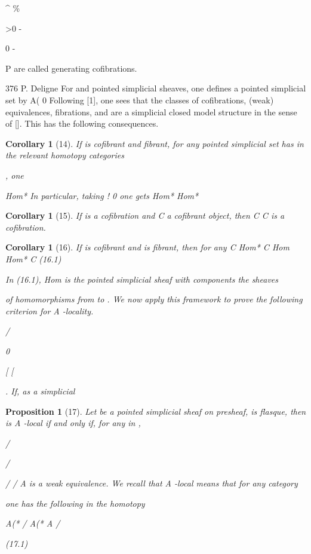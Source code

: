 \documentclass[11pt,a4paper]{article}
\theoremstyle{plain}
\newtheorem{proposition}[theorem]{Proposition}
\newtheorem{corollary}[theorem]{Corollary}
\theoremstyle{definition}
\begin{document}
\textasciicircum{} \%

>0  - 

0  - 

P are called generating cofibrations.

376
P. Deligne
For  and  pointed simplicial sheaves, one defines a pointed simplicial set
   by
   A( 0   
Following [1], one sees that the classes of cofibrations, (weak) equivalences, fibrations, and are a simplicial closed model structure in the sense of []. This has the
following consequences.





\begin{corollary}[14]
If is cofibrant and fibrant, for any pointed simplicial set
has in the relevant homotopy categories

, one

    Hom*    
In particular, taking ! 0  one gets
Hom*       
Hom*

\end{corollary}

\begin{corollary}[15]
If 
 is a cofibration and C a cofibrant object, then  C
 C is a cofibration.
\end{corollary}

\begin{corollary}[16]
If  is cofibrant and  is fibrant, then for any C
Hom* C Hom   Hom* C   
(16.1)

  

In (16.1), Hom
is the pointed simplicial sheaf with components the sheaves

of homomorphisms from
to .
We now apply this framework to prove the following criterion for A -locality.

/

 0 



[ 
 [ 

. If, as a simplicial
\end{corollary}

\begin{proposition}[17]
Let be a pointed simplicial sheaf on
presheaf, is flasque, then is A -local if and only if, for any in
,

/

/

/ /  A
is a weak equivalence.
We recall that A -local means that for any
category

 one has the following in the homotopy

A(* /  A(*  A   / 

(17.1)

\end{proposition}
\end{document}
